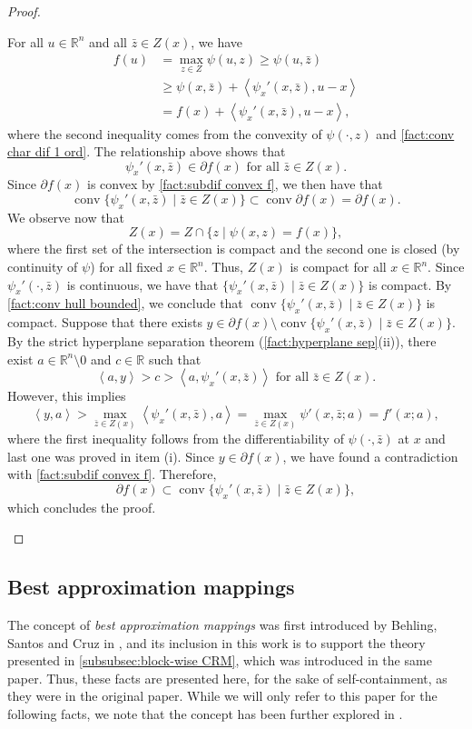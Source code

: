 \documentclass[smallextended,numbook,nospthms]{svjour3}
\theoremstyle{plain}
\theoremstyle{definition}
\def\RR{\mathds R}
\newcommand{\scal}[2]{\left\langle{#1},{#2}  \right\rangle}
\begin{document}
\begin{proof}
\begin{listi}
		\item For all $u \in \RR^n$ and all $\bar{z} \in Z(x)$, we have
		\begin{align}
			f(u) &= \max_{z \in Z} \psi (u,z) \geq \psi(u,\bar{z}) \\
				&\geq \psi(x,\bar{z}) + \scal{\psi_{x}'(x,\bar{z})}{u-x} \\
				&= f(x) + \scal{\psi_{x}'(x,\bar{z})}{u-x},
		\end{align}
		where the second inequality comes from the convexity of $\psi(\cdot,z)$ and \cref{fact:conv char dif 1 ord}. The relationship above shows that
		\[
		\psi_{x}'(x,\bar{z}) \in \partial f(x) \text{ for all } \bar{z} \in Z(x).
		\]
		Since $\partial f(x)$ is convex by \cref{fact:subdif convex f}, we then have that
		\[
		\operatorname{conv} \{\psi_{x}'(x,\bar{z}) \mid \bar{z} \in Z(x) \} \subset \operatorname{conv} \partial f(x) = \partial f(x).
		\]
		We observe now that
		\[
		Z(x)=Z\cap \{z \mid \psi(x,z)=f(x)\},
		\]
		where the first set of the intersection is compact and the second one is closed (by continuity of $\psi$) for all fixed $x \in \RR^n$. Thus, $Z(x)$ is compact for all $x \in \RR^n$. Since $\psi_{x}'(\cdot,\bar{z})$ is continuous, we have that $\{\psi_{x}'(x,\bar{z}) \mid \bar{z} \in Z(x) \}$ is compact. By \cref{fact:conv hull bounded}, we conclude that $\operatorname{conv} \{\psi_{x}'(x,\bar{z}) \mid \bar{z} \in Z(x)\}$ is compact. Suppose that there exists $y \in \partial f(x) \setminus \operatorname{conv} \{\psi_{x}'(x,\bar{z}) \mid \bar{z} \in Z(x)\}$.
		By the strict hyperplane separation theorem (\cref{fact:hyperplane sep}(ii)), there exist $a \in \RR^n \setminus {0}$ and $c \in \RR$ such that
		\[
		\scal{a}{y} > c > \scal{a}{\psi_{x}'(x,\bar{z})} \text{ for all } \bar{z} \in Z(x).
		\]
		However, this implies
		\[
		\scal{y}{a} > \max_{\bar{z} \in Z(x)}\scal{\psi_{x}'(x,\bar{z})}{a} = \max_{\bar{z} \in Z(x)} \psi'(x,\bar{z};a)=f'(x;a),
		\]
		where the first inequality follows from the differentiability of $\psi(\cdot,\bar{z})$ at $x$ and last one was proved in item (i). Since $y \in \partial f(x)$, we have found a contradiction with \cref{fact:subdif convex f}. Therefore,
		\[
		\partial f(x) \subset \operatorname{conv} \{\psi_{x}'(x,\bar{z}) \mid \bar{z} \in Z(x)\},
		\]
		which concludes the proof.
	\end{listi}
\end{proof}
\subsection{Best approximation mappings}\label{subsec:BAM}
The concept of \emph{best approximation mappings} was first introduced by Behling, Santos and Cruz in \cite{Behling:2019dj}, and its inclusion in this work is to support the theory presented in \cref{subsubsec:block-wise CRM}, which was introduced in the same paper. Thus, these facts are presented here, for the sake of self-containment, as they were in the original paper. While we will only refer to this paper for the following facts, we note that the concept has been further explored in \cite{Bauschke:2020}.
\end{document}
